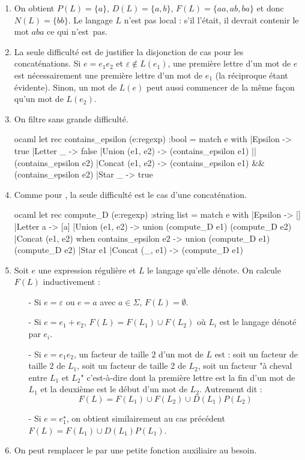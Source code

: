 \documentclass[a4paper, 11pt]{article}
\newenvironment{code-env}
{
  \mdfsetup{
    roundcorner=2pt,
    topline=true,
    leftline=true,
    bottomline=true,
    rightline=true,
    innertopmargin=4pt,
    innerbottommargin=4pt,
    innerrightmargin=4pt,
    innerlinewidth=1pt,
    backgroundcolor={gray!10},
    linecolor={gray!40},
    linewidth=0.1pt,
  }
  \begin{mdframed}[]
  }{\end{mdframed}}
\newenvironment{fancy-code}[1]
  {\VerbatimEnvironment
    \begin{code-env}
    \begin{verbatim}}
 {\end{verbatim}\end{code-env}}
\begin{document}
\begin{enumerate}
    \item On obtient $P(L) = \{a\}$, $D(L) = \{a,b\}$, $F(L) = \{aa, ab, ba\}$ et donc $N(L) = \{bb\}$. Le langage $L$ n'est pas local : s'il l'était, il devrait contenir le mot $aba$ ce qui n'est~pas.
    

    \item La seule difficulté est de justifier la disjonction de cas pour les concaténations. Si $e = e_1e_2$ et $\varepsilon \notin L(e_1)$, une première lettre d'un mot de $e$ est nécessairement une première lettre d'un mot de $e_1$ (la réciproque étant évidente). Sinon, un mot de $L(e)$ peut aussi commencer de la même façon qu'un mot de $L(e_2)$.
    

    \item On filtre sans grande difficulté.
    \smallskip
    \begin{fancy-code}{ocaml}
let rec contains_epsilon (e:regexp) :bool = match e with
  |Epsilon -> true
  |Letter _ -> false
  |Union (e1, e2) -> (contains_epsilon e1) || (contains_epsilon e2)
  |Concat (e1, e2) -> (contains_epsilon e1) && (contains_epsilon e2)
  |Star _ -> true
    \end{fancy-code}

    \item  Comme pour , la seule difficulté est le cas d'une concaténation.
  \smallskip
    \begin{fancy-code}{ocaml}
let rec compute_D (e:regexp) :string list  = match e with
  |Epsilon -> []
  |Letter a -> [a]
  |Union (e1, e2) -> union (compute_D e1) (compute_D e2)
  |Concat (e1, e2) when contains_epsilon e2 ->
     union (compute_D e1) (compute_D e2)
  |Star e1 |Concat (_, e1) -> (compute_D e1)
    \end{fancy-code}

\pagebreak

    \item Soit $e$ une expression régulière et $L$ le langage qu'elle dénote. On calcule $F(L)$ inductivement : \begin{itemize}
        \item[-] Si $e = \varepsilon$ ou $e = a$ avec $a \in \Sigma$, $F(L) = \emptyset$.
        \item[-] Si $e = e_1+e_2$, $F(L) = F(L_1) \cup F(L_2)$ où $L_i$ est le langage dénoté par $e_i$.
        \item[-] Si $e = e_1e_2$, un facteur de taille $2$ d'un mot de $L$ est : soit un facteur de taille 2 de $L_1$, soit un facteur de taille 2 de $L_2$, soit un facteur "à cheval entre $L_1$ et $L_2$" c'est-à-dire dont la première lettre est la fin d'un mot de $L_1$ et la deuxième est le début d'un mot de $L_2$. Autrement dit : \[F(L) = F(L_1) \cup F(L_2) \cup D(L_1)P(L_2) \] 
        \item[-] Si $e = e_1^{\star}$, on obtient similairement au cas précédent $F(L) = F(L_1) \cup D(L_1)P(L_1)$.
    \end{itemize}
    \item On peut remplacer le  par une petite fonction auxiliaire au besoin.
    \smallskip


\end{enumerate}
\end{document}

